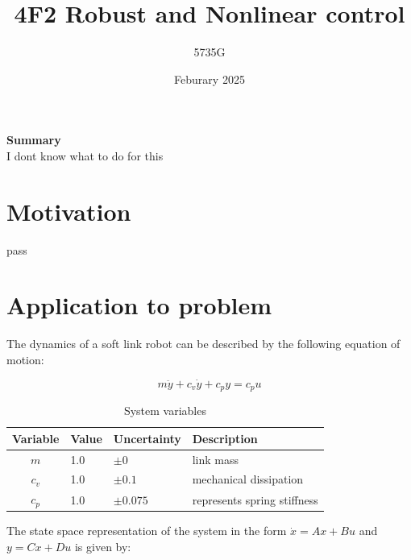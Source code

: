\documentclass{article}
\begin{document}
\immediate{}

\title{4F2 Robust and Nonlinear control}
\author{5735G}
\date{Feburary 2025}
\maketitle 

\begin{center}
    \textbf{Summary} \\
    I dont know what to do for this
\end{center}

\section{Motivation}
pass


\section{Application to problem}

The dynamics of a soft link robot can be described by the following equation of motion:

\begin{equation}
    m\ddot{y} + c_v \dot{y} + c_p y = c_p u
\end{equation}

\begin{table}[h]
    \centering
    \begin{tabular}{c|ll|l}
        Variable & Value & Uncertainty & Description \\
        \hline
        $m$ & 1.0 & $\pm0$ & link mass \\
        $c_v$ & 1.0 & $\pm 0.1$ & mechanical dissipation \\
        $c_p$ & 1.0 & $\pm 0.075$ & represents spring stiffness \\
    \end{tabular}
    \caption{System variables}
    \label{tab:parameters}
\end{table}

The state space representation of the system in the form $\dot{x} = Ax + Bu$ and $y = Cx + Du$ is given by:
\end{document}

